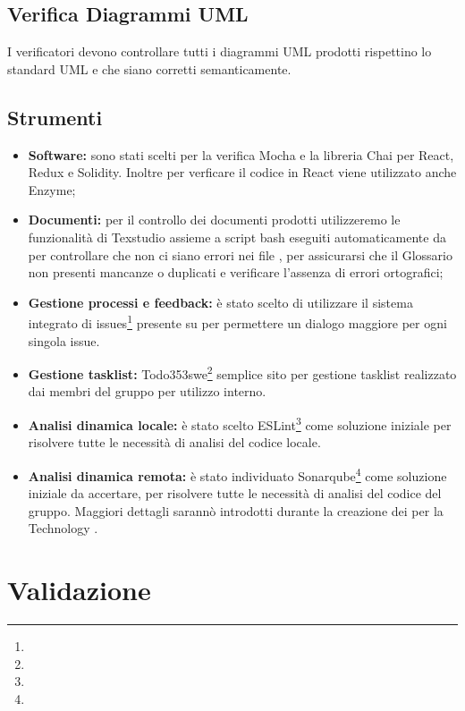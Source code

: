 \documentclass[NormeDiProgetto.tex]{subfiles}
\begin{document}
	\subsection{Verifica Diagrammi UML}
	I verificatori devono controllare tutti i diagrammi UML prodotti rispettino lo standard UML e che siano corretti semanticamente.
	
	\subsection{Strumenti}
	\begin{itemize}
		\item \textbf{Software:}
		sono stati scelti per la verifica Mocha e la libreria Chai per React, Redux e Solidity. Inoltre per verficare il codice in React viene utilizzato anche Enzyme;
		\item \textbf{Documenti:} per il controllo dei documenti prodotti utilizzeremo le funzionalità di Texstudio assieme a script bash eseguiti automaticamente da  per controllare che non ci siano errori nei file , per assicurarsi che il Glossario non presenti mancanze o duplicati e verificare l'assenza di errori ortografici;
		\item \textbf{Gestione processi e feedback:} è stato scelto di utilizzare il sistema integrato di issues\footnote{} presente su  per permettere un dialogo maggiore per ogni singola issue. 
		\item \textbf{Gestione tasklist:} Todo353swe\footnote{} semplice sito per gestione tasklist realizzato dai membri del gruppo per utilizzo interno.
		\item \textbf{Analisi dinamica locale:} è stato scelto ESLint\footnote{} come soluzione iniziale per risolvere tutte le necessità di analisi del codice locale.
		\item \textbf{Analisi dinamica remota:} è stato individuato Sonarqube\footnote{} come soluzione iniziale da accertare, per risolvere tutte le necessità di analisi del codice del gruppo. Maggiori dettagli sarannò introdotti durante la creazione dei \poc per la Technology .
	\end{itemize}


	\section{Validazione}
\end{document}
